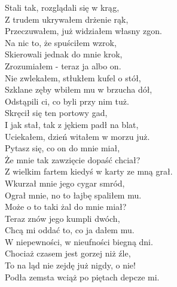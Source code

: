 \newpage
Stali tak, rozglądali się w krąg, \\
Z trudem ukrywałem drżenie rąk, \\
Przeczuwałem, już widziałem własny zgon. \\
Na nic to, że spuściłem wzrok, \\
Skierowali jednak do mnie krok, \\
Zrozumiałem - teraz ja albo on. \\
Nie zwlekałem, stłukłem kufel o stół, \\
Szklane zęby wbiłem mu w brzucha dół, \\
Odstąpili ci, co byli przy nim tuż. \\
Skręcił się ten portowy gad, \\
I jak stał, tak z jękiem padł na blat, \\
Uciekałem, dzień witałem w morzu już. \\

Pytasz się, co on do mnie miał, \\
Że mnie tak zawzięcie dopaść chciał? \\
Z wielkim fartem kiedyś w karty ze mną grał. \\
Wkurzał mnie jego cygar smród, \\
Ograł mnie, no to łajbę spaliłem mu. \\
Może o to taki żal do mnie miał? \\
Teraz znów jego kumpli dwóch, \\
Chcą mi oddać to, co ja dałem mu. \\
W niepewności, w nieufności biegną dni. \\
Chociaż czasem jest gorzej niż źle, \\
To na ląd nie zejdę już nigdy, o nie! \\
Podła zemsta wciąż po piętach depcze mi.